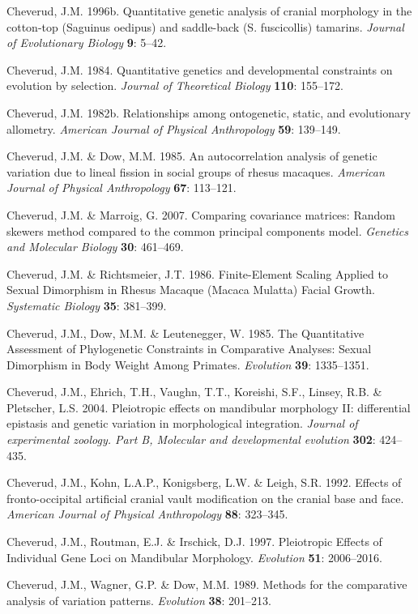 \documentclass[12pt,twoside]{report}
\begin{document}
Cheverud, J.M. 1996b. Quantitative genetic analysis of cranial
morphology in the cotton-top (Saguinus oedipus) and saddle-back (S.
fuscicollis) tamarins. \emph{Journal of Evolutionary Biology}
\textbf{9}: 5--42.

Cheverud, J.M. 1984. Quantitative genetics and developmental constraints
on evolution by selection. \emph{Journal of Theoretical Biology}
\textbf{110}: 155--172.

Cheverud, J.M. 1982b. Relationships among ontogenetic, static, and
evolutionary allometry. \emph{American Journal of Physical Anthropology}
\textbf{59}: 139--149.

Cheverud, J.M. \& Dow, M.M. 1985. An autocorrelation analysis of genetic
variation due to lineal fission in social groups of rhesus macaques.
\emph{American Journal of Physical Anthropology} \textbf{67}: 113--121.

Cheverud, J.M. \& Marroig, G. 2007. Comparing covariance matrices:
Random skewers method compared to the common principal components model.
\emph{Genetics and Molecular Biology} \textbf{30}: 461--469.

Cheverud, J.M. \& Richtsmeier, J.T. 1986. Finite-Element Scaling Applied
to Sexual Dimorphism in Rhesus Macaque (Macaca Mulatta) Facial Growth.
\emph{Systematic Biology} \textbf{35}: 381--399.

Cheverud, J.M., Dow, M.M. \& Leutenegger, W. 1985. The Quantitative
Assessment of Phylogenetic Constraints in Comparative Analyses: Sexual
Dimorphism in Body Weight Among Primates. \emph{Evolution} \textbf{39}:
1335--1351.

Cheverud, J.M., Ehrich, T.H., Vaughn, T.T., Koreishi, S.F., Linsey, R.B.
\& Pletscher, L.S. 2004. Pleiotropic effects on mandibular morphology
II: differential epistasis and genetic variation in morphological
integration. \emph{Journal of experimental zoology. Part B, Molecular
and developmental evolution} \textbf{302}: 424--435.

Cheverud, J.M., Kohn, L.A.P., Konigsberg, L.W. \& Leigh, S.R. 1992.
Effects of fronto-occipital artificial cranial vault modification on the
cranial base and face. \emph{American Journal of Physical Anthropology}
\textbf{88}: 323--345.

Cheverud, J.M., Routman, E.J. \& Irschick, D.J. 1997. Pleiotropic
Effects of Individual Gene Loci on Mandibular Morphology.
\emph{Evolution} \textbf{51}: 2006--2016.

Cheverud, J.M., Wagner, G.P. \& Dow, M.M. 1989. Methods for the
comparative analysis of variation patterns. \emph{Evolution}
\textbf{38}: 201--213.
\end{document}
